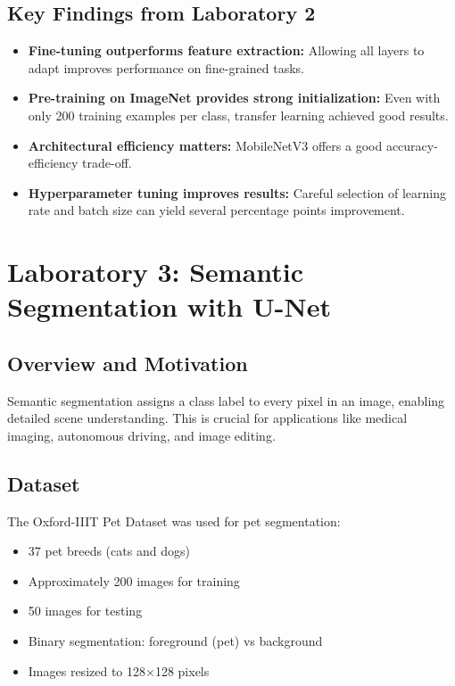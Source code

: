 \documentclass[conference]{IEEEtran}
\begin{document}
\subsection{Key Findings from Laboratory 2}

\begin{itemize}
\item \textbf{Fine-tuning outperforms feature extraction:} Allowing all layers to adapt improves performance on fine-grained tasks.
\item \textbf{Pre-training on ImageNet provides strong initialization:} Even with only 200 training examples per class, transfer learning achieved good results.
\item \textbf{Architectural efficiency matters:} MobileNetV3 offers a good accuracy-efficiency trade-off.
\item \textbf{Hyperparameter tuning improves results:} Careful selection of learning rate and batch size can yield several percentage points improvement.
\end{itemize}

\section{Laboratory 3: Semantic Segmentation with U-Net}

\subsection{Overview and Motivation}

Semantic segmentation assigns a class label to every pixel in an image, enabling detailed scene understanding. This is crucial for applications like medical imaging, autonomous driving, and image editing.

\subsection{Dataset}

The Oxford-IIIT Pet Dataset was used for pet segmentation:
\begin{itemize}
\item 37 pet breeds (cats and dogs)
\item Approximately 200 images for training
\item 50 images for testing
\item Binary segmentation: foreground (pet) vs background
\item Images resized to 128×128 pixels
\end{itemize}
\end{document}

